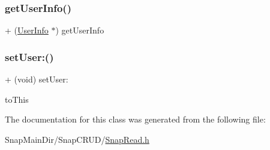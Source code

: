 \hypertarget{interface_snap_read_a9282ffeb874dc7bd1dbfa8f6b30ff6a9}{}\label{interface_snap_read_a9282ffeb874dc7bd1dbfa8f6b30ff6a9} 
\subsubsection{\texorpdfstring{get\+User\+Info()}{getUserInfo()}}
{\footnotesize\ttfamily + (\hyperlink{interface_user_info}{User\+Info} $\ast$) get\+User\+Info \begin{DoxyParamCaption}{ }\end{DoxyParamCaption}}

\hypertarget{interface_snap_read_aa6ebb46023ca7715d2f229c144e2195d}{}\label{interface_snap_read_aa6ebb46023ca7715d2f229c144e2195d} 
\subsubsection{\texorpdfstring{set\+User\+:()}{setUser:()}}
{\footnotesize\ttfamily + (void) set\+User\+: \begin{DoxyParamCaption}\item[{(\hyperlink{interface_user_info}{User\+Info} $\ast$)}]{to\+This }\end{DoxyParamCaption}}



The documentation for this class was generated from the following file\+:\begin{DoxyCompactItemize}
\item 
Snap\+Main\+Dir/\+Snap\+C\+R\+U\+D/\hyperlink{_snap_read_8h}{Snap\+Read.\+h}\end{DoxyCompactItemize}
